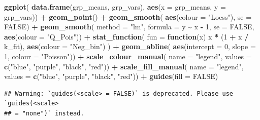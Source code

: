 \documentclass[
  12pt,
]{book}
\newenvironment{Shaded}{\begin{snugshade}}{\end{snugshade}}
\newcommand{\ControlFlowTok}[1]{\textcolor[rgb]{0.13,0.29,0.53}{\textbf{#1}}}
\newcommand{\DataTypeTok}[1]{\textcolor[rgb]{0.13,0.29,0.53}{#1}}
\newcommand{\DecValTok}[1]{\textcolor[rgb]{0.00,0.00,0.81}{#1}}
\newcommand{\KeywordTok}[1]{\textcolor[rgb]{0.13,0.29,0.53}{\textbf{#1}}}
\newcommand{\NormalTok}[1]{#1}
\newcommand{\OperatorTok}[1]{\textcolor[rgb]{0.81,0.36,0.00}{\textbf{#1}}}
\newcommand{\OtherTok}[1]{\textcolor[rgb]{0.56,0.35,0.01}{#1}}
\newcommand{\StringTok}[1]{\textcolor[rgb]{0.31,0.60,0.02}{#1}}
\begin{document}
\begin{Shaded}
\begin{Highlighting}[]
\KeywordTok{ggplot}\NormalTok{(}
  \KeywordTok{data.frame}\NormalTok{(grp\_means, grp\_vars),}
  \KeywordTok{aes}\NormalTok{(}\DataTypeTok{x =}\NormalTok{ grp\_means, }\DataTypeTok{y =}\NormalTok{ grp\_vars)) }\OperatorTok{+}
\StringTok{  }\KeywordTok{geom\_point}\NormalTok{() }\OperatorTok{+}
\StringTok{  }\KeywordTok{geom\_smooth}\NormalTok{(}
    \KeywordTok{aes}\NormalTok{(}\DataTypeTok{colour =} \StringTok{"Loess"}\NormalTok{), }\DataTypeTok{se =} \OtherTok{FALSE}\NormalTok{) }\OperatorTok{+}
\StringTok{  }\KeywordTok{geom\_smooth}\NormalTok{(}
    \DataTypeTok{method =} \StringTok{"lm"}\NormalTok{, }\DataTypeTok{formula =}\NormalTok{ y }\OperatorTok{\textasciitilde{}}\StringTok{ }\NormalTok{x }\OperatorTok{{-}}\StringTok{ }\DecValTok{1}\NormalTok{, }\DataTypeTok{se =} \OtherTok{FALSE}\NormalTok{,}
    \KeywordTok{aes}\NormalTok{(}\DataTypeTok{colour =} \StringTok{"Q\_Pois"}\NormalTok{)) }\OperatorTok{+}
\StringTok{  }\KeywordTok{stat\_function}\NormalTok{(}
    \DataTypeTok{fun =} \ControlFlowTok{function}\NormalTok{(x) x }\OperatorTok{*}\StringTok{ }\NormalTok{(}\DecValTok{1} \OperatorTok{+}\StringTok{ }\NormalTok{x }\OperatorTok{/}\StringTok{ }\NormalTok{k\_fit),}
    \KeywordTok{aes}\NormalTok{(}\DataTypeTok{colour =} \StringTok{"Neg\_bin"}\NormalTok{)}
\NormalTok{  ) }\OperatorTok{+}
\StringTok{  }\KeywordTok{geom\_abline}\NormalTok{(}
    \KeywordTok{aes}\NormalTok{(}\DataTypeTok{intercept =} \DecValTok{0}\NormalTok{, }\DataTypeTok{slope =} \DecValTok{1}\NormalTok{, }\DataTypeTok{colour =} \StringTok{"Poisson"}\NormalTok{)) }\OperatorTok{+}
\StringTok{  }\KeywordTok{scale\_colour\_manual}\NormalTok{(}
    \DataTypeTok{name =} \StringTok{"legend"}\NormalTok{,}
    \DataTypeTok{values =} \KeywordTok{c}\NormalTok{(}\StringTok{"blue"}\NormalTok{, }\StringTok{"purple"}\NormalTok{, }\StringTok{"black"}\NormalTok{, }\StringTok{"red"}\NormalTok{)) }\OperatorTok{+}
\StringTok{  }\KeywordTok{scale\_fill\_manual}\NormalTok{(}
    \DataTypeTok{name =} \StringTok{"legend"}\NormalTok{,}
    \DataTypeTok{values =} \KeywordTok{c}\NormalTok{(}\StringTok{"blue"}\NormalTok{, }\StringTok{"purple"}\NormalTok{, }\StringTok{"black"}\NormalTok{, }\StringTok{"red"}\NormalTok{)) }\OperatorTok{+}
\StringTok{  }\KeywordTok{guides}\NormalTok{(}\DataTypeTok{fill =} \OtherTok{FALSE}\NormalTok{)}
\end{Highlighting}
\end{Shaded}

\begin{verbatim}
## Warning: `guides(<scale> = FALSE)` is deprecated. Please use `guides(<scale>
## = "none")` instead.
\end{verbatim}
\end{document}
